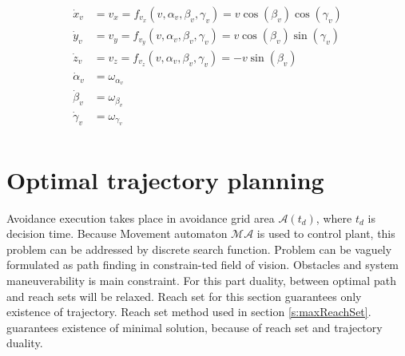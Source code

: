 \begin{equation}\label{eq:simple3ddifferentialequations}
    \begin{aligned}
        \dot{x}_v &= v_x  =f_{v_x}(v,\alpha_v,\beta_v,\gamma_v) = v\cos(\beta_v)\cos(\gamma_v)\\
        \dot{y}_v &= v_y  =f_{v_y}(v,\alpha_v,\beta_v,\gamma_v) = v\cos(\beta_v)\sin(\gamma_v)\\
        \dot{z}_v &= v_z  =f_{v_z}(v,\alpha_v,\beta_v,\gamma_v) = -v\sin(\beta_v)\\
        \dot{\alpha}_v &= \omega_{\alpha_v}\\
        \dot{\beta}_v &= \omega_{\beta_v}\\
        \dot{\gamma}_v &= \omega_{\gamma_v}\\
    \end{aligned}
\end{equation}   

\newpage
\section{Optimal trajectory planning}
\noindent Avoidance execution takes place in avoidance grid area $\mathscr{A}(t_d)$, where $t_d$ is decision time. Because Movement automaton $\mathscr{MA}$ is used to control plant, this problem can be addressed by discrete search function. Problem can be vaguely formulated as path finding in constrain-ted field of vision. Obstacles and system maneuverability is main constraint. For this part duality, between optimal path and reach sets will be relaxed. Reach set for this section guarantees only existence of trajectory. Reach set method used in section \ref{s:maxReachSet}. guarantees existence of minimal solution, because of reach set and trajectory duality.


